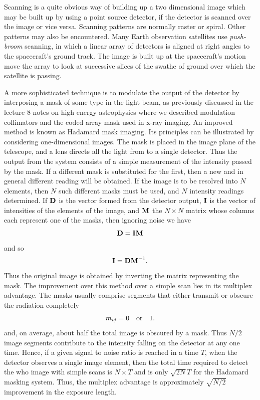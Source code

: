 Scanning is a quite obvious way of building up a two dimensional image which may be built up by using a point source detector, if the detector is scanned over the image or vice versa. Scanning patterns are normally raster or spiral. Other patterns may also be encountered. Many Earth observation satellites use {\it push-broom} scanning, in which a linear array of detectors is aligned at right angles to the spacecraft's ground track. The image is built up at the spacecraft's motion move the array to look at successive slices of the swathe of ground over which the satellite is passing.

A more sophisticated technique is to modulate the output of the detector by interposing a mask of some type in the light beam, as previously discussed in the lecture 8 notes on high energy astrophysics where we described modulation collimators and the coded array mask used in x-ray imaging. An improved method is known as Hadamard mask imaging. Its principles can be illustrated by considering one-dimensional images. The mask is placed in the image plane of the telescope, and a lens directs all the light from to a single detector. Thus the output from the system consists of a simple measurement of the intensity passed by the mask. If a different mask is substituted for the first, then a new and in general different reading will be obtained. If the image is to be resolved into
$N$ elements, then $N$ such different masks must be used, and $N$ intensity readings determined. If ${\bf D}$ is the vector formed from the detector output, ${\bf I}$ is the vector of intensities of the elements of the image, and ${\bf M}$ the $N\times N$ matrix whose columns each represent one of the masks, then ignoring noise we have
\[
{\bf D}={\bf IM}
\]
and so 
\[
{\bf I}={\bf DM}^{-1}.
\]
Thus the original image is obtained by inverting the matrix representing the mask. The improvement over this method over a simple scan lies in its multiplex advantage. The masks usually comprise segments that either transmit or obscure the radiation completely 
\[ 
m_{ij}=0 \quad {\rm or} \quad 1.
\]
and, on average, about half the total image is obscured by a mask. Thus $N/2$ image segments contribute to the intensity falling on the detector at any one time. Hence, if 
a given signal to noise ratio is reached in a time $T$, when the detector observes a single image element, then the total time required to detect the who image with simple scans is $N\times T$ and is only $\sqrt{2N}T$ for the Hadamard masking system. Thus, the multiplex advantage is approximately $\sqrt{N/2}$ improvement in the exposure length. 

